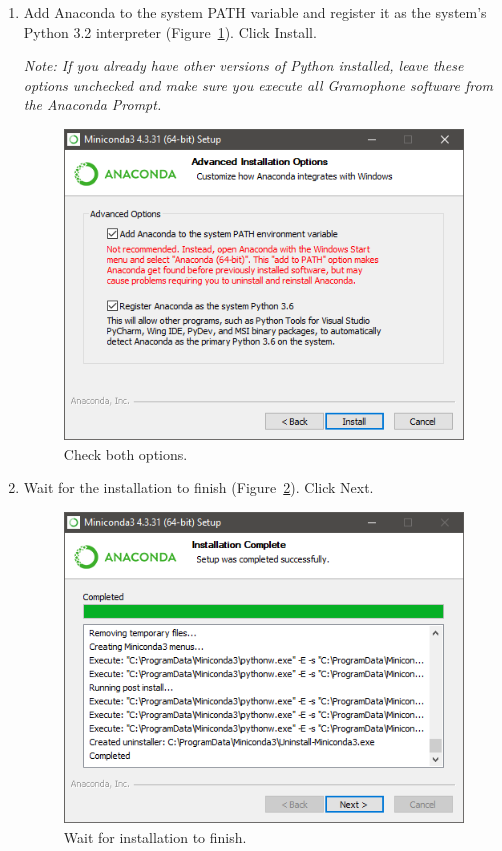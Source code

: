 \documentclass[11pt,a4paper]{article}
\newcommand{\note}[1]{\textit{Note: {#1}}}
\begin{document}
\begin{enumerate}
\item Add Anaconda to the system PATH variable and register it as the system's Python 3.2 interpreter (Figure~\ref{fig:miniconda_install_options}). Click Install. 

\note{If you already have other versions of Python installed, leave these options unchecked and make sure you execute all Gramophone software from the Anaconda Prompt.}

	\begin{figure}[H]
	\centering
	\includegraphics[scale=0.8]{miniconda_install_options.PNG}
	\caption{Check both options.}
	\label{fig:miniconda_install_options}
	\end{figure}

\newpage
\item Wait for the installation to finish (Figure~\ref{fig:miniconda_install_done}). Click Next.
	\begin{figure}[H]
	\centering
	\includegraphics[scale=0.8]{miniconda_install_done.PNG}
	\caption{Wait for installation to finish.}
	\label{fig:miniconda_install_done}
	\end{figure}



\end{enumerate}
\end{document}
